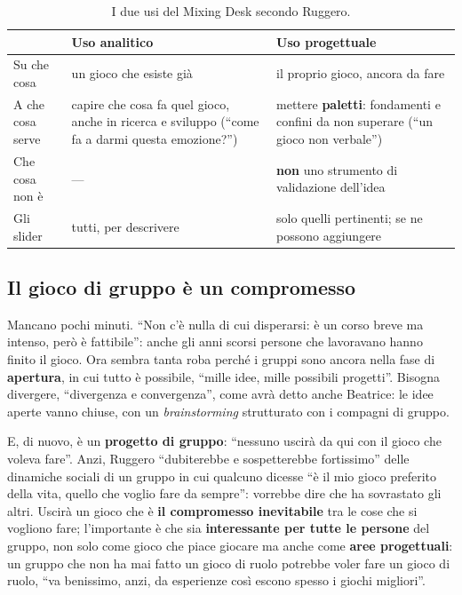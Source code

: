 \begin{table}[htbp]
\centering
\begin{tabular}{@{}p{3.2cm}p{4.6cm}p{4.6cm}@{}}
\toprule
 & \textbf{Uso analitico} & \textbf{Uso progettuale} \\
\midrule
Su che cosa & un gioco che esiste già & il proprio gioco, ancora da fare \\
A che cosa serve & capire che cosa fa quel gioco, anche in ricerca e sviluppo
(``come fa a darmi questa emozione?'') & mettere \textbf{paletti}: fondamenti e
confini da non superare (``un gioco non verbale'') \\
Che cosa non è & --- & \textbf{non} uno strumento di validazione dell'idea \\
Gli slider & tutti, per descrivere & solo quelli pertinenti; se ne possono
aggiungere \\
\bottomrule
\end{tabular}
\caption{I due usi del Mixing Desk secondo Ruggero.}
\label{a7:tab:mixing}
\end{table}

\subsection{Il gioco di gruppo è un compromesso}
\label{a7:sec:tut-compromesso}

Mancano pochi minuti. ``Non c'è nulla di cui disperarsi: è un corso breve ma intenso,
però è fattibile'': anche gli anni scorsi persone che lavoravano hanno finito il gioco.
Ora sembra tanta roba perché i gruppi sono ancora nella fase di \textbf{apertura}, in
cui tutto è possibile, ``mille idee, mille possibili progetti''. Bisogna divergere,
``divergenza e convergenza'', come avrà detto anche Beatrice: le idee aperte vanno
chiuse, con un \emph{brainstorming} strutturato con i compagni di gruppo.

E, di nuovo, è un \textbf{progetto di gruppo}: ``nessuno uscirà da qui con il gioco
che voleva fare''. Anzi, Ruggero ``dubiterebbe e sospetterebbe fortissimo'' delle
dinamiche sociali di un gruppo in cui qualcuno dicesse ``è il mio gioco preferito
della vita, quello che voglio fare da sempre'': vorrebbe dire che ha sovrastato gli
altri. Uscirà un gioco che è \textbf{il compromesso inevitabile} tra le cose che si
vogliono fare; l'importante è che sia \textbf{interessante per tutte le persone} del
gruppo, non solo come gioco che piace giocare ma anche come \textbf{aree progettuali}:
un gruppo che non ha mai fatto un gioco di ruolo potrebbe voler fare un gioco di ruolo,
``va benissimo, anzi, da esperienze così escono spesso i giochi migliori''.

